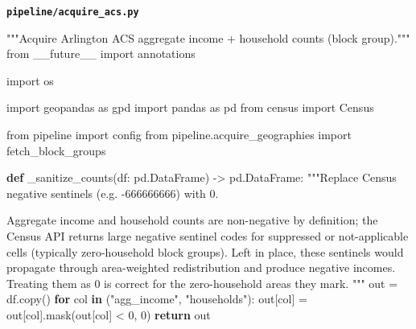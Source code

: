 \documentclass[
  letterpaper,
  DIV=11,
  numbers=noendperiod]{scrreprt}
\newenvironment{Shaded}{\begin{snugshade}}{\end{snugshade}}
\newcommand{\CommentTok}[1]{\textcolor[rgb]{0.37,0.37,0.37}{#1}}
\newcommand{\ControlFlowTok}[1]{\textcolor[rgb]{0.00,0.23,0.31}{\textbf{#1}}}
\newcommand{\DecValTok}[1]{\textcolor[rgb]{0.68,0.00,0.00}{#1}}
\newcommand{\ImportTok}[1]{\textcolor[rgb]{0.00,0.46,0.62}{#1}}
\newcommand{\KeywordTok}[1]{\textcolor[rgb]{0.00,0.23,0.31}{\textbf{#1}}}
\newcommand{\NormalTok}[1]{\textcolor[rgb]{0.00,0.23,0.31}{#1}}
\newcommand{\OperatorTok}[1]{\textcolor[rgb]{0.37,0.37,0.37}{#1}}
\newcommand{\StringTok}[1]{\textcolor[rgb]{0.13,0.47,0.30}{#1}}
\begin{document}
\textbf{\texttt{pipeline/acquire\_acs.py}}

\begin{Shaded}
\begin{Highlighting}[]
\CommentTok{"""Acquire Arlington ACS aggregate income + household counts (block group)."""}
\ImportTok{from}\NormalTok{ \_\_future\_\_ }\ImportTok{import}\NormalTok{ annotations}

\ImportTok{import}\NormalTok{ os}

\ImportTok{import}\NormalTok{ geopandas }\ImportTok{as}\NormalTok{ gpd}
\ImportTok{import}\NormalTok{ pandas }\ImportTok{as}\NormalTok{ pd}
\ImportTok{from}\NormalTok{ census }\ImportTok{import}\NormalTok{ Census}

\ImportTok{from}\NormalTok{ pipeline }\ImportTok{import}\NormalTok{ config}
\ImportTok{from}\NormalTok{ pipeline.acquire\_geographies }\ImportTok{import}\NormalTok{ fetch\_block\_groups}


\KeywordTok{def}\NormalTok{ \_sanitize\_counts(df: pd.DataFrame) }\OperatorTok{{-}\textgreater{}}\NormalTok{ pd.DataFrame:}
    \CommentTok{"""Replace Census negative sentinels (e.g. {-}666666666) with 0.}

\CommentTok{    Aggregate income and household counts are non{-}negative by definition; the}
\CommentTok{    Census API returns large negative sentinel codes for suppressed or}
\CommentTok{    not{-}applicable cells (typically zero{-}household block groups). Left in place,}
\CommentTok{    these sentinels would propagate through area{-}weighted redistribution and}
\CommentTok{    produce negative incomes. Treating them as 0 is correct for the}
\CommentTok{    zero{-}household areas they mark.}
\CommentTok{    """}
\NormalTok{    out }\OperatorTok{=}\NormalTok{ df.copy()}
    \ControlFlowTok{for}\NormalTok{ col }\KeywordTok{in}\NormalTok{ (}\StringTok{"agg\_income"}\NormalTok{, }\StringTok{"households"}\NormalTok{):}
\NormalTok{        out[col] }\OperatorTok{=}\NormalTok{ out[col].mask(out[col] }\OperatorTok{\textless{}} \DecValTok{0}\NormalTok{, }\DecValTok{0}\NormalTok{)}
    \ControlFlowTok{return}\NormalTok{ out}



\end{Highlighting}
\end{Shaded}
\end{document}
